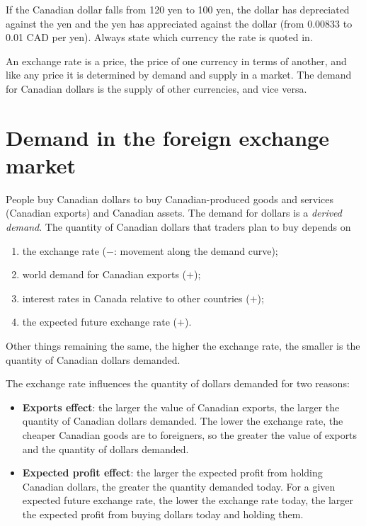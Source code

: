 \begin{important}[Pitfall]
If the Canadian dollar falls from 120 yen to 100 yen, the dollar has depreciated against
the yen and the yen has appreciated against the dollar (from 0.00833 to 0.01 CAD per
yen). Always state which currency the rate is quoted in.
\end{important}

An exchange rate is a price, the price of one currency in terms of another, and like any
price it is determined by demand and supply in a market. The demand for Canadian dollars
is the supply of other currencies, and vice versa.

\section{Demand in the foreign exchange market}

People buy Canadian dollars to buy Canadian-produced goods and services (Canadian
exports) and Canadian assets. The demand for dollars is a \emph{derived demand}. The
quantity of Canadian dollars that traders plan to buy depends on
\begin{enumerate}
  \item the exchange rate ($-$: movement along the demand curve);
  \item world demand for Canadian exports ($+$);
  \item interest rates in Canada relative to other countries ($+$);
  \item the expected future exchange rate ($+$).
\end{enumerate}

\begin{important}
Other things remaining the same, the higher the exchange rate, the smaller is the
quantity of Canadian dollars demanded.
\end{important}

The exchange rate influences the quantity of dollars demanded for two reasons:
\begin{itemize}
  \item \textbf{Exports effect}: the larger the value of Canadian exports, the larger the
        quantity of Canadian dollars demanded. The lower the exchange rate, the cheaper
        Canadian goods are to foreigners, so the greater the value of exports and the
        quantity of dollars demanded.
  \item \textbf{Expected profit effect}: the larger the expected profit from holding
        Canadian dollars, the greater the quantity demanded today. For a given expected
        future exchange rate, the lower the exchange rate today, the larger the expected
        profit from buying dollars today and holding them.
\end{itemize}

